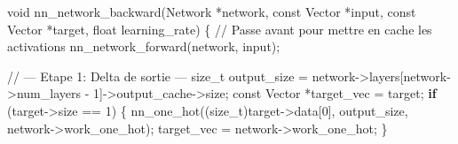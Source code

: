 \documentclass[
  letterpaper,
  DIV=11,
  numbers=noendperiod]{scrartcl}
\newenvironment{Shaded}{\begin{snugshade}}{\end{snugshade}}
\newcommand{\CommentTok}[1]{\textcolor[rgb]{0.37,0.37,0.37}{#1}}
\newcommand{\ControlFlowTok}[1]{\textcolor[rgb]{0.00,0.23,0.31}{\textbf{#1}}}
\newcommand{\DataTypeTok}[1]{\textcolor[rgb]{0.68,0.00,0.00}{#1}}
\newcommand{\DecValTok}[1]{\textcolor[rgb]{0.68,0.00,0.00}{#1}}
\newcommand{\NormalTok}[1]{\textcolor[rgb]{0.00,0.23,0.31}{#1}}
\newcommand{\OperatorTok}[1]{\textcolor[rgb]{0.37,0.37,0.37}{#1}}
\begin{document}
\begin{Shaded}
\begin{Highlighting}[]
\DataTypeTok{void}\NormalTok{ nn\_network\_backward}\OperatorTok{(}\NormalTok{Network }\OperatorTok{*}\NormalTok{network}\OperatorTok{,} \DataTypeTok{const}\NormalTok{ Vector }\OperatorTok{*}\NormalTok{input}\OperatorTok{,}
                         \DataTypeTok{const}\NormalTok{ Vector }\OperatorTok{*}\NormalTok{target}\OperatorTok{,} \DataTypeTok{float}\NormalTok{ learning\_rate}\OperatorTok{)} \OperatorTok{\{}
    \CommentTok{// Passe avant pour mettre en cache les activations}
\NormalTok{    nn\_network\_forward}\OperatorTok{(}\NormalTok{network}\OperatorTok{,}\NormalTok{ input}\OperatorTok{);}

    \CommentTok{// --- Etape 1: Delta de sortie ---}
    \DataTypeTok{size\_t}\NormalTok{ output\_size }\OperatorTok{=}\NormalTok{ network}\OperatorTok{{-}\textgreater{}}\NormalTok{layers}\OperatorTok{[}\NormalTok{network}\OperatorTok{{-}\textgreater{}}\NormalTok{num\_layers }\OperatorTok{{-}} \DecValTok{1}\OperatorTok{]{-}\textgreater{}}\NormalTok{output\_cache}\OperatorTok{{-}\textgreater{}}\NormalTok{size}\OperatorTok{;}
    \DataTypeTok{const}\NormalTok{ Vector }\OperatorTok{*}\NormalTok{target\_vec }\OperatorTok{=}\NormalTok{ target}\OperatorTok{;}
    \ControlFlowTok{if} \OperatorTok{(}\NormalTok{target}\OperatorTok{{-}\textgreater{}}\NormalTok{size }\OperatorTok{==} \DecValTok{1}\OperatorTok{)} \OperatorTok{\{}
\NormalTok{        nn\_one\_hot}\OperatorTok{((}\DataTypeTok{size\_t}\OperatorTok{)}\NormalTok{target}\OperatorTok{{-}\textgreater{}}\NormalTok{data}\OperatorTok{[}\DecValTok{0}\OperatorTok{],}\NormalTok{ output\_size}\OperatorTok{,}\NormalTok{ network}\OperatorTok{{-}\textgreater{}}\NormalTok{work\_one\_hot}\OperatorTok{);}
\NormalTok{        target\_vec }\OperatorTok{=}\NormalTok{ network}\OperatorTok{{-}\textgreater{}}\NormalTok{work\_one\_hot}\OperatorTok{;}
    \OperatorTok{\}}


\end{Highlighting}
\end{Shaded}
\end{document}
